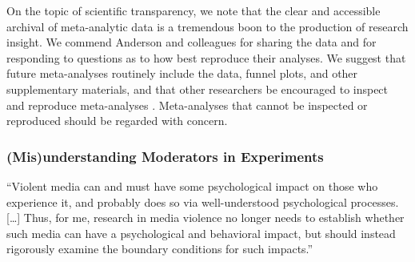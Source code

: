 \documentclass[man]{apa6}
\begin{document}
On the topic of scientific transparency, we note that the clear and accessible archival of meta-analytic data is a tremendous boon to the production of research insight. We commend Anderson and colleagues for sharing the data and for responding to questions as to how best reproduce their analyses. We suggest that future meta-analyses routinely include the data, funnel plots, and other supplementary materials, and that other researchers be encouraged to inspect and reproduce meta-analyses \citep{Lakens:etal:InPress}. Meta-analyses that cannot be inspected or reproduced should be regarded with concern.



\subsubsection{(Mis)understanding Moderators in Experiments}

\begin{displayquote}
``Violent media can and must have some psychological impact on those who experience it, and probably does so via well-understood psychological processes. [\ldots] Thus, for me, research in media violence no longer needs to establish whether such media can have a psychological and behavioral impact, but should instead rigorously examine the boundary conditions for such impacts.''  \citep[p. 62]{Warburton:2014}
\end{displayquote}
\end{document}
